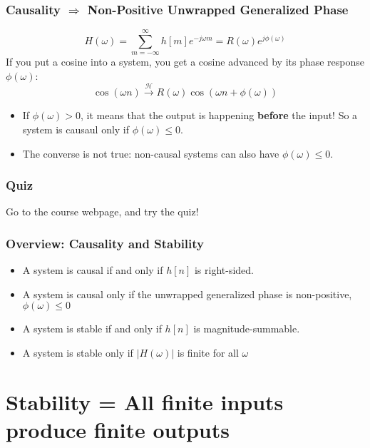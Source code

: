 \documentclass{beamer}
\begin{document}
\begin{frame}
  \frametitle{Causality $\Rightarrow$ Non-Positive Unwrapped Generalized Phase}

  \begin{displaymath}
    H(\omega) = \sum_{m=-\infty}^\infty h[m] e^{-j\omega m} = R(\omega)e^{j\phi(\omega)}
  \end{displaymath}
  If you put a cosine into a system, you get a cosine advanced by its phase response
  $\phi(\omega)$:
  \begin{displaymath}
    \cos(\omega n) \stackrel{\mathcal H}{\longrightarrow} R(\omega)
    \cos\left(\omega n+\phi(\omega)\right)
  \end{displaymath}
  \begin{itemize}
  \item If $\phi(\omega)>0$, it means that the output is happening {\bf before} the input!  So a system is causaul only if $\phi(\omega)\le 0$.
  \item The converse is not true: non-causal systems can also have $\phi(\omega)\le 0$.
  \end{itemize}
\end{frame}

\begin{frame}
  \frametitle{Quiz}

  Go to the course webpage, and try the quiz!
\end{frame}

\begin{frame}
  \frametitle{Overview: Causality and Stability}

  \begin{itemize}
  \item A system is causal if and only if $h[n]$ is right-sided.
  \item A system is causal only if the unwrapped generalized phase is non-positive,
    $\phi(\omega)\le 0$
  \item A system is stable if and only if $h[n]$ is
    magnitude-summable.
  \item A system is stable only if $|H(\omega)|$ is finite for all $\omega$
  \end{itemize}
\end{frame}



\section[Stability]{Stability = All finite inputs produce finite outputs}
\setcounter{subsection}{1}
\end{document}

